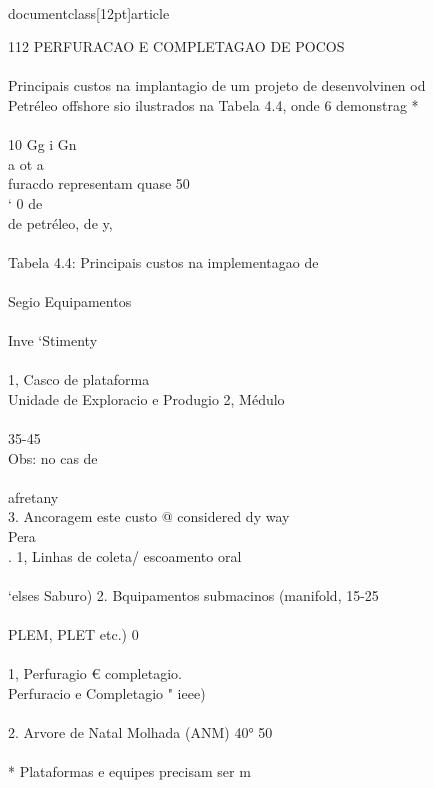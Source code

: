 \\documentclass[12pt]{article}
\begin{document}
112 PERFURACAO E COMPLETAGAO DE POCOS\\
\\
Principais custos na implantagio de um projeto de desenvolvinen od\\
Petréleo offshore sio ilustrados na Tabela 4.4, onde 6 demonstrag *\\
\\
10 Gg i Gn\\
a ot a\\
furacdo representam quase 50\\%
‘ 0 de\\
de petréleo, de y,\\
\\
Tabela 4.4: Principais custos na implementagao de\\
\\
Segio Equipamentos\\
\\
Inve ‘Stimenty\\
\\
1, Casco de plataforma\\
Unidade de Exploracio e Produgio 2, Médulo\\
\\
35-45\\%
Obs: no cas de\\
\\
afretany\\
3. Ancoragem este custo @ considered dy way\\
Pera\\
. 1, Linhas de coleta/ escoamento oral\\
\\
‘elses Saburo) 2. Bquipamentos submacinos (manifold, 15-25\\%
\\
PLEM, PLET etc.) 0\\
\\
1, Perfuragio € completagio.\\
Perfuracio e Completagio " ieee)\\
\\
2. Arvore de Natal Molhada (ANM) 40° 50\\%
\\
* Plataformas e equipes precisam ser m\\
\end{document}
